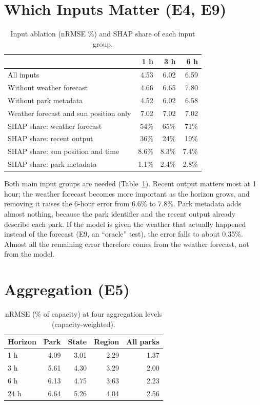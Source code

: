 \documentclass[12pt]{report}
\begin{document}
\section{Which Inputs Matter (E4, E9)}
\vspace{1mm}
\begin{table}[htbp]
\centering
\caption{Input ablation (nRMSE \%) and SHAP share of each input group.}
\label{tab:e4}
\begin{tabular}{lrrr}
\toprule
 & 1 h & 3 h & 6 h \\
\midrule
All inputs & 4.53 & 6.02 & 6.59 \\
Without weather forecast & 4.66 & 6.65 & 7.80 \\
Without park metadata & 4.52 & 6.02 & 6.58 \\
Weather forecast and sun position only & 7.02 & 7.02 & 7.02 \\
\midrule
SHAP share: weather forecast & 54\% & 65\% & 71\% \\
SHAP share: recent output & 36\% & 24\% & 19\% \\
SHAP share: sun position and time & 8.6\% & 8.3\% & 7.4\% \\
SHAP share: park metadata & 1.1\% & 2.4\% & 2.8\% \\
\bottomrule
\end{tabular}
\end{table}

Both main input groups are needed (Table~\ref{tab:e4}). Recent output matters most at 1 hour; the weather forecast becomes more important as the horizon grows, and removing it raises the 6-hour error from 6.6\% to 7.8\%. Park metadata adds almost nothing, because the park identifier and the recent output already describe each park. If the model is given the weather that actually happened instead of the forecast (E9, an ``oracle'' test), the error falls to about 0.35\%. Almost all the remaining error therefore comes from the weather forecast, not from the model.

\section{Aggregation (E5)}
\vspace{1mm}
\begin{table}[htbp]
\centering
\caption{nRMSE (\% of capacity) at four aggregation levels (capacity-weighted).}
\label{tab:e5}
\begin{tabular}{lrrrr}
\toprule
Horizon & Park & State & Region & All parks \\
\midrule
1 h & 4.09 & 3.01 & 2.29 & 1.37 \\
3 h & 5.61 & 4.30 & 3.29 & 2.00 \\
6 h & 6.13 & 4.75 & 3.63 & 2.23 \\
24 h & 6.64 & 5.26 & 4.04 & 2.56 \\
\bottomrule
\end{tabular}
\end{table}
\end{document}
